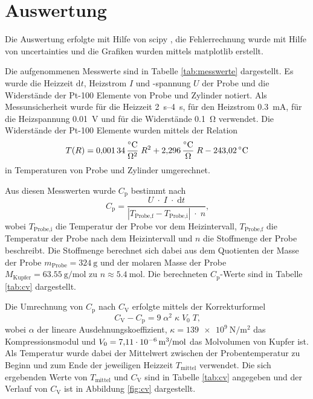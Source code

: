 \newpage
\section{Auswertung}
\label{sec:Auswertung}

Die Auswertung erfolgte mit Hilfe von scipy \cite{scipy},
die Fehlerrechnung wurde mit Hilfe von uncertainties \cite{uncertainties}
und die Grafiken wurden mittels matplotlib \cite{matplotlib} erstellt.

Die aufgenommenen Messwerte sind in Tabelle \ref{tab:messwerte}
dargestellt. Es wurde die Heizzeit $\text{d}t$, Heizstrom $I$ und -spannung $U$ der Probe und
die Widerstände der Pt-100 Elemente von Probe und Zylinder notiert. Als Messunsicherheit
wurde für die Heizzeit \SIrange{2}{4}{\second},
für den Heizstrom \SI{0.3}{\milli\ampere},
für die Heizspannung \SI{0.01}{\volt} und
für die Widerstände \SI{0.1}{\ohm} verwendet.
Die Widerstände der Pt-100 Elemente wurden mittels der Relation
\begin{equation}
    T(R) = \SI{0.00134}{\celsius\per\raiseto{2}\ohm}\;R^2 +
    \SI{2.296}{\celsius\per\ohm}\;R - \SI{243.02}{\celsius}
    \label{eqn:TausR}
\end{equation}
in Temperaturen von Probe und Zylinder umgerechnet.



Aus diesen Messwerten wurde $C_\text{p}$ bestimmt nach
\begin{equation*}
    C_\text{p} = \frac{U\;\cdot\;I\;\cdot\;\text{d}t}{|T_\text{Probe,f}-T_\text{Probe,i}|\;\cdot\;n}
    \text{,}
\end{equation*}
wobei $T_\text{Probe,i}$ die Temperatur der Probe vor dem Heizintervall, $T_\text{Probe,f}$
die Temperatur der Probe nach dem Heizintervall und $n$ die Stoffmenge der Probe beschreibt.
Die Stoffmenge berechnet sich dabei aus dem Quotienten der Masse der Probe
$m_\text{Probe} = \SI{324}{\gram}$ \cite{anleitung} und der molaren Masse der Probe
$M_\text{Kupfer} = \SI{63.55}{\gram\per\mole}$ \cite{lenntech} zu
$n \approx \SI{5.4}{\mole}$. Die berechneten $C_\text{p}$-Werte sind in Tabelle
\ref{tab:cv} dargestellt.

Die Umrechnung von $C_\text{p}$ nach $C_\text{V}$ erfolgte mittels der Korrekturformel
\begin{equation*}
    C_\text{V} - C_\text{p} = 9\;\alpha^2\;\kappa\;V_0\;T\text{,}
\end{equation*}
wobei $\alpha$ der lineare Ausdehnungskoeffizient,
$\kappa = \SI{139e9}{\newton\per\meter\squared}$ \cite{demtroeder} das Kompressionsmodul
und $V_0 = \SI{7.11e-6}{\raiseto{3}\meter\per\mole}$ \cite{webelements} das Molvolumen
von Kupfer ist. Als Temperatur wurde dabei der Mittelwert zwischen der Probentemperatur
zu Beginn und zum Ende der jeweiligen Heizzeit $T_\text{mittel}$ verwendet.
Die sich ergebenden Werte von $T_\text{mittel}$ und $C_\text{V}$ sind in Tabelle
\ref{tab:cv} angegeben und der Verlauf von $C_\text{V}$ ist in Abbildung
\ref{fig:cv} dargestellt.

